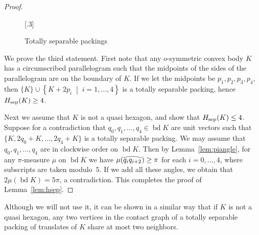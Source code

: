 \documentclass[a4paper,12pt]{article}
\theoremstyle{plain}
\theoremstyle{definition}
\newcommand{\setbuilder}[2]{\left\{#1\;\middle|\;#2\right\}}
\DeclareMathOperator{\bd}{bd}
\newcommand{\Hsep}{H_{\textnormal{sep}}}
\newcommand{\arc}[1]{\overarc{#1}}
\newcommand{\overarc}[1]{\ifmmode\mathchoice{%
\tikz [baseline = (N.base)] {
      \node [inner sep = 0pt] (N) {$\displaystyle#1$};
      \draw [line width = 0.4pt,] 
         ([xshift=0.1ex,yshift=0.3ex]N.north west) to[out=15,in=165]
         ([yshift=0.3ex]N.north east);
   }
}{%
\tikz [baseline = (N.base)] {
      \node [inner sep = 0pt] (N) {$\textstyle#1$};
      \draw [line width = 0.4pt,] 
         ([xshift=0.1ex,yshift=0.3ex]N.north west) to[out=15,in=165]
         ([yshift=0.3ex]N.north east);
   }
}{%
\tikz [baseline = (N.base)] {
      \node [inner sep = 0pt] (N) {$\scriptstyle#1$};
      \draw [line width = 0.3pt,] 
         ([xshift=0.1ex,yshift=0.3ex]N.north west) to[out=15,in=165]
         ([yshift=0.3ex]N.north east);
   }
}{%
\tikz [baseline = (N.base)] {
      \node [inner sep = 0pt] (N) {$\scriptscriptstyle#1$};
      \draw [line width = 0.213pt,] 
         ([xshift=0.1ex,yshift=0.3ex]N.north west) to[out=15,in=165]
         ([yshift=0.3ex]N.north east);
   }
}   
\else   
\tikz [baseline = (N.base)] {
      \node [inner sep = 0pt] (N) {#1};
      \draw [line width = 0.4pt,] 
         ([xshift=0.1ex,yshift=0.3ex]N.north west) to[out=15,in=165]
         ([yshift=0.3ex]N.north east);
   }
\fi   
}
\begin{document}
\begin{proof}
\begin{figure}
{\begin{tikzpicture}[xslant=-0.57,yscale=0.9,scale=0.11]
\end{tikzpicture}}%
[.3\textwidth]{%
}%
\caption{Totally separable packings}\label{fig:totsep}
\end{figure}

We prove the third statement.
First note that any $o$-symmetric convex body $K$ has a circumscribed parallelogram such that the midpoints of the sides of the parallelogram are on the boundary of $K$.
If we let the midpoints be $p_1,p_2,p_3,p_4$, then $\{K\}\cup\setbuilder{K+2p_i}{i=1,\dots,4}$ is a totally separable packing, 
hence $\Hsep(K)\geq 4$.

Next we assume that $K$ is not a quasi hexagon, and show that $\Hsep(K)\leq 4$.
Suppose for a contradiction that $q_0,q_1, \ldots,q_4\in\bd K$ are unit vectors such that 
$\{K, 2q_0+K,\ldots,2q_4+K\}$ is a totally separable packing.
We may assume that $q_0,q_1,\dots,q_4$ are in clockwise order on $\bd K$.
Then by Lemma~\ref{lem:piangle}, for any $\pi$-measure $\mu$ on $\bd K$ we have $\mu(\arc{q_i q_{i+2}})\geq\pi$ for each $i=0,\dots,4$, where subscripts are taken modulo~$5$.
If we add all these angles, we obtain that $2\mu(\bd K)=5\pi$, a contradiction.
This completes the proof of Lemma~\ref{lem:hsep}.
\end{proof}

Although we will not use it, it can be shown in a similar way that if $K$ is not a quasi hexagon, any two 
vertices in the contact graph of a totally separable packing of translates of $K$ share at most two neighbors.
\end{document}
